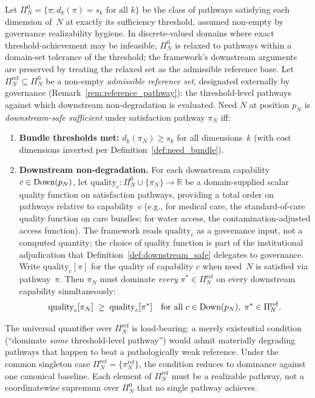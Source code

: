 \begin{definition}
\label{def:downstream_safe}
Let
$\Pi_N^0 = \{\pi : d_k(\pi) = s_k \text{ for all } k\}$
be the class of pathways satisfying each dimension of~$N$ at
exactly its sufficiency threshold, assumed non-empty by
governance realizability hygiene.  In discrete-valued domains
where exact threshold-achievement may be infeasible, $\Pi_N^0$
is relaxed to pathways within a domain-set tolerance of the
threshold; the framework's downstream arguments are preserved
by treating the relaxed set as the admissible reference base.  Let
$\Pi_N^{\mathrm{ref}} \subseteq \Pi_N^0$ be a non-empty
\emph{admissible reference set}, designated externally by
governance (Remark~\ref{rem:reference_pathway}): the
threshold-level pathways against which downstream
non-degradation is evaluated.  Need $N$ at position $p_N$ is
\emph{downstream-safe sufficient} under satisfaction pathway
$\pi_N$ iff:
\begin{enumerate}
\item[(a)] \textbf{Bundle thresholds met:}
  $d_k(\pi_N) \geq s_k$ for all dimensions~$k$ (with cost
  dimensions inverted per Definition~\ref{def:need_bundle}).
\item[(b)] \textbf{Downstream non-degradation.}
  For each downstream capability $c \in \mathrm{Down}(p_N)$, let
  $\mathrm{quality}_c : \Pi_N^0 \cup
  \{\pi_N\} \to \mathbb{R}$ be a domain-supplied scalar quality
  function on satisfaction pathways, providing a total order on
  pathways relative to capability~$c$ (e.g., for medical care,
  the standard-of-care quality function on care bundles; for
  water access, the contamination-adjusted access function).  The framework
  reads $\mathrm{quality}_c$ as a governance input, not a
  computed quantity; the choice of quality function is part of
  the institutional adjudication that
  Definition~\ref{def:downstream_safe} delegates to governance.
  Write $\mathrm{quality}_c[\pi]$ for the quality of capability
  $c$ when need~$N$ is satisfied via pathway~$\pi$.  Then
  $\pi_N$ must dominate \emph{every}
  $\pi^* \in \Pi_N^{\mathrm{ref}}$ on every downstream
  capability simultaneously:
  \[
    \mathrm{quality}_c[\pi_N] \;\geq\;
    \mathrm{quality}_c[\pi^*]
    \quad\text{for all } c \in \mathrm{Down}(p_N),
    \;\pi^* \in \Pi_N^{\mathrm{ref}}.
  \]
\end{enumerate}
The universal quantifier over $\Pi_N^{\mathrm{ref}}$ is
load-bearing: a merely existential condition (``dominate
\emph{some} threshold-level pathway'') would admit materially
degrading pathways that happen to beat a pathologically weak
reference.  Under the common singleton case
$\Pi_N^{\mathrm{ref}} = \{\pi_N^{\mathrm{ref}}\}$, the condition
reduces to dominance against one canonical baseline.  Each
element of $\Pi_N^{\mathrm{ref}}$ must be a realizable pathway,
not a coordinatewise supremum over $\Pi_N^0$ that no single
pathway achieves.
\end{definition}


